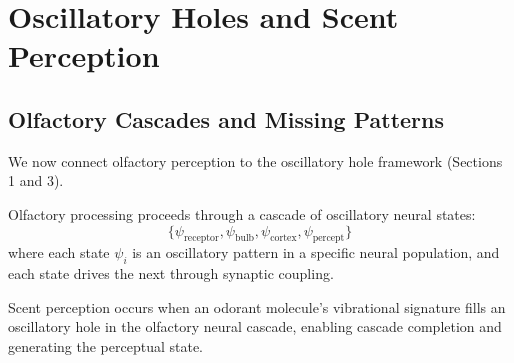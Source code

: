\section{Oscillatory Holes and Scent Perception}

\subsection{Olfactory Cascades and Missing Patterns}

We now connect olfactory perception to the oscillatory hole framework (Sections 1 and 3).

\begin{definition}
\label{def:olfactory_cascade}
Olfactory processing proceeds through a cascade of oscillatory neural states:
\begin{equation}
\{\psi_{\text{receptor}}, \psi_{\text{bulb}}, \psi_{\text{cortex}}, \psi_{\text{percept}}\}
\end{equation}
where each state $\psi_i$ is an oscillatory pattern in a specific neural population, and each state drives the next through synaptic coupling.
\end{definition}

\begin{theorem}
\label{thm:scent_hole_filling}
Scent perception occurs when an odorant molecule's vibrational signature fills an oscillatory hole in the olfactory neural cascade, enabling cascade completion and generating the perceptual state.
\end{theorem}

